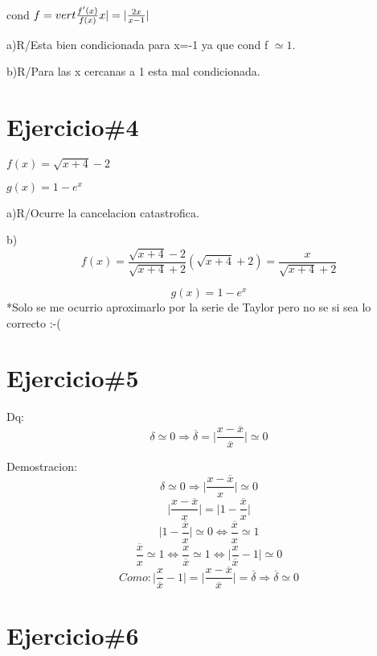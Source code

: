 \documentclass[a4paper,12pt]{article}
\begin{document}
cond \(f=\\vert \frac{f'(x)}{f(x)}x \vert =\vert \frac{2x}{x-1}\vert \)

a)R/Esta bien condicionada para x=-1 ya que cond f $\simeq 1$.\[\]

b)R/Para las x cercanas a 1 esta mal condicionada.

\section*{Ejercicio\#4}

\(f(x)=\sqrt{x+4}-2\)

\(g(x)=1-e^x \)\[\]

a)R/Ocurre la cancelacion catastrofica.\[\]

b)\[f(x)=\frac{\sqrt{x+4}-2}{\sqrt{x+4}+2}(\sqrt{x+4}+2)=\frac{x}{\sqrt{x+4}+2}\]\[\]

\[g(x)=1-e^x\]*Solo se me ocurrio aproximarlo por la serie de Taylor pero no se si sea lo correcto :-(

\section*{Ejercicio\#5}

Dq:\[\delta \simeq 0 \Rightarrow \overline{\delta }=\vert \frac{x-\overline{x}}{\overline{x}}\vert  \simeq 0\]

Demostracion:\[\delta \simeq 0 \Rightarrow \vert \frac{x-\overline{x}}{x}\vert  \simeq 0\]
\[\vert \frac{x-\overline{x}}{x}\vert = \vert 1-\frac{\overline{x}}{x}\vert\]
\[\vert 1-\frac{\overline{x}}{x}\vert\simeq 0 \Leftrightarrow \frac{\overline{x}}{x}\simeq 1\]
\[\frac{\overline{x}}{x}\simeq 1 \Leftrightarrow \frac{x}{\overline{x}}\simeq 1 \Leftrightarrow \vert \frac{x}{\overline{x}}-1\vert \simeq 0\]
\[Como: \vert \frac{x}{\overline{x}}-1\vert =\vert \frac{x-\overline{x}}{\overline{x}}\vert=\overline{\delta} \Rightarrow \overline{\delta}\simeq 0\]

\section*{Ejercicio\#6}
\end{document}
